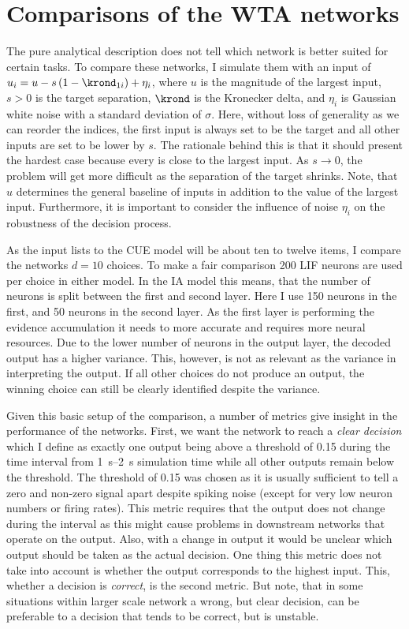 \section{Comparisons of the WTA networks}
The pure analytical description does not tell which network is better suited for certain tasks.
To compare these networks, I simulate them with an input of $u_i = u - s\del{1 - \krond_{1i}} + \eta_i$, where $u$ is the magnitude of the largest input, $s > 0$ is the target separation, $\krond$ is the Kronecker delta, and $\eta_i$ is Gaussian white noise with a standard deviation of $\sigma$.
Here, without loss of generality as we can reorder the indices, the first input is always set to be the target and all other inputs are set to be lower by $s$.
The rationale behind this is that it should present the hardest case because every is close to the largest input.
As $s \rightarrow 0$, the problem will get more difficult as the separation of the target shrinks.
Note, that $u$ determines the general baseline of inputs in addition to the value of the largest input.
Furthermore, it is important to consider the influence of noise $\eta_i$ on the robustness of the decision process.

As the input lists to the CUE model will be about ten to twelve items, I compare the networks $d=10$ choices.
To make a fair comparison 200 LIF neurons are used per choice in either model.
In the IA model this means, that the number of neurons is split between the first and second layer.
Here I use \num{150} neurons in the first, and \num{50} neurons in the second layer.
As the first layer is performing the evidence accumulation it needs to more accurate and requires more neural resources.
Due to the lower number of neurons in the output layer, the decoded output has a higher variance.
This, however, is not as relevant as the variance in interpreting the output.
If all other choices do not produce an output, the winning choice can still be clearly identified despite the variance.

Given this basic setup of the comparison, a number of metrics give insight in the performance of the networks.
First, we want the network to reach a \emph{clear decision} which I define as exactly one output being above a threshold of \num{0.15} during the time interval from \SIrange{1}{2}{\second} simulation time while all other outputs remain below the threshold.
The threshold of \num{0.15} was chosen as it is usually sufficient to tell a zero and non-zero signal apart despite spiking noise (except for very low neuron numbers or firing rates).
This metric requires that the output does not change during the interval as this might cause problems in downstream networks that operate on the output.
Also, with a change in output it would be unclear which output should be taken as the actual decision.
One thing this metric does not take into account is whether the output corresponds to the highest input.
This, whether a decision is \emph{correct}, is the second metric.
But note, that in some situations within larger scale network a wrong, but clear decision, can be preferable to a decision that tends to be correct, but is unstable.

